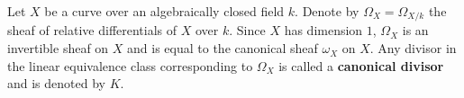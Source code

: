 Let $X$ be a curve over an algebraically closed field $k$. Denote by $\Omega_X = \Omega_{X/k}$ the sheaf of relative differentials of $X$ over $k$. Since $X$ has dimension $1$, $\Omega_X$ is an invertible sheaf on $X$ and is equal to the canonical sheaf $\omega_X$ on $X$. Any divisor in the linear equivalence class corresponding to $\Omega_X$ is called a \textbf{canonical divisor} and is denoted by $K$.
